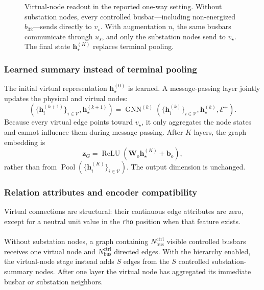 \begin{figure}[H]
  \centering
  \resizebox{0.98\linewidth}{!}{%
  }
  \caption{Virtual-node readout in the reported one-way setting. Without
  substation nodes, every controlled busbar---including non-energized
  $b_{32}$---sends directly to $v_\star$. With augmentation $n$, the same
  busbars communicate through $u_s$, and only the substation nodes send to
  $v_\star$. The final state
  $\mathbf h_\star^{(K)}$ replaces terminal pooling.}
  \label{fig:virtual-node-readout}
\end{figure}

\subsubsection{Learned summary instead of terminal pooling}
\label{subsec:virtual-node-summary}

The initial virtual representation $\mathbf{h}_{\star}^{(0)}$ is learned. A
message-passing layer jointly updates the physical and virtual nodes:
\begin{equation}
  \left(
    \{\mathbf{h}_{i}^{(k+1)}\}_{i\in\mathcal{V}},
    \mathbf{h}_{\star}^{(k+1)}
  \right)
  =
  \operatorname{GNN}^{(k)}
  \left(
    \{\mathbf{h}_{i}^{(k)}\}_{i\in\mathcal{V}},
    \mathbf{h}_{\star}^{(k)},
    \mathcal{E}^{+}
  \right).
  \label{eq:virtual-node-update}
\end{equation}
Because every virtual edge points toward $v_{\star}$, it only aggregates the
node states and cannot influence them during message passing. After $K$ layers,
the graph embedding is
\begin{equation}
  \mathbf{z}_{G}
  = \operatorname{ReLU}
    \left(\mathbf{W}_{o}\mathbf{h}_{\star}^{(K)}+\mathbf{b}_{o}\right),
  \label{eq:virtual-node-readout}
\end{equation}
rather than from
$\operatorname{Pool}(\{\mathbf{h}_{i}^{(K)}\}_{i\in\mathcal{V}})$. The output
dimension is unchanged.

\subsubsection{Relation attributes and encoder compatibility}
\label{subsec:virtual-node-compatibility}

Virtual connections are structural: their continuous edge attributes are zero,
except for a neutral unit value in the
\texttt{rho} position when that feature exists.
\\
\\
Without substation nodes, a graph containing $N_{\mathrm{bus}}^{\mathrm{ctrl}}$
visible controlled busbars receives one virtual node and
$N_{\mathrm{bus}}^{\mathrm{ctrl}}$ directed edges. With the hierarchy enabled,
the virtual-node stage instead adds $S$ edges from the $S$ controlled
substation-summary nodes. After one layer the virtual node has aggregated its
immediate busbar or substation neighbors.

